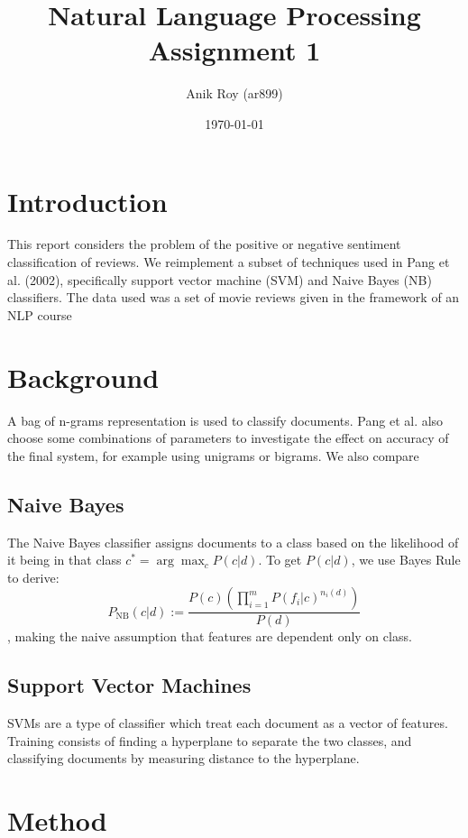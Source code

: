 \documentclass[12pt,a4paper]{article}
\title{
  Natural Language Processing \\
  \large Assignment 1}
\author{Anik Roy (ar899)}
\date{\today}
\begin{document}
\maketitle
\begin{multicols}{2}
  
\section{Introduction}

This report considers the problem of the positive or negative sentiment classification of reviews. We reimplement a subset of techniques used in Pang et al. (2002)\cite{pang2002thumbs}, specifically support vector machine (SVM) and Naive Bayes (NB) classifiers. The data used was a set of movie reviews given in the framework of an NLP course

\section{Background}

A bag of n-grams representation is used to classify documents. Pang et al. also choose some combinations of parameters to investigate the effect on accuracy of the final system, for example using unigrams or bigrams. We also compare 

\subsection{Naive Bayes}
The Naive Bayes classifier assigns documents to a class based on the likelihood of it being in that class $c^{*} = \arg \max_{c}P(c | d)$. To get $P(c | d)$, we use Bayes Rule to derive:
\[P_\mathrm{NB}(c | d) := \frac{P(c)(\prod^{m}_{i=1}P(f_{i} | c)^{n_{i}(d)})}{P(d)} \], 
making the naive assumption that features are dependent only on class.

\subsection{Support Vector Machines}
SVMs are a type of classifier which treat each document as a vector of features. Training consists of finding a hyperplane to separate the two classes, and classifying documents by measuring distance to the hyperplane.

\section{Method}



\end{multicols}
\end{document}
